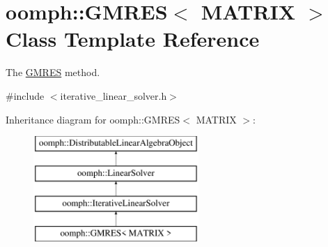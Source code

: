 \hypertarget{classoomph_1_1GMRES}{}\section{oomph\+:\+:G\+M\+R\+ES$<$ M\+A\+T\+R\+IX $>$ Class Template Reference}
\label{classoomph_1_1GMRES}


The \hyperlink{classoomph_1_1GMRES}{G\+M\+R\+ES} method.  




{\ttfamily \#include $<$iterative\+\_\+linear\+\_\+solver.\+h$>$}

Inheritance diagram for oomph\+:\+:G\+M\+R\+ES$<$ M\+A\+T\+R\+IX $>$\+:\begin{figure}[H]
\begin{center}
\leavevmode
\includegraphics[height=4.000000cm]{classoomph_1_1GMRES}
\end{center}
\end{figure}
